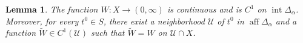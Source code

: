 \documentclass[12pt,reqno]{amsart}
\numberwithin{equation}{section}
\newtheorem{lemma}[theorem]{Lemma}
\theoremstyle{remark}
\newcommand{\Ncal}{\mathcal N}
\newcommand{\Dcal}{\mathcal D}
\begin{document}

\begin{lemma}\label{lem:W-regularity}
	The function \(W:X\to(0,\infty)\) is continuous and is
	\(C^1\) on \(\operatorname{int}\Delta_\alpha\). Moreover, for every
	\(t^0\in S\), there exist a neighborhood \(\mathcal U\) of \(t^0\)
	in \(\operatorname{aff}\Delta_\alpha\) and a function
	\(\widetilde W\in C^1(\mathcal U)\) such that
	\(
	\widetilde W=W\)
	on \(\mathcal U\cap X
	\).
\end{lemma}
\end{document}
